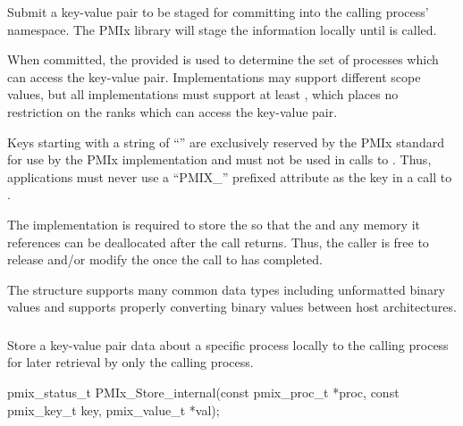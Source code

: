 \descr

Submit a key-value pair to be staged for committing into the calling process' namespace.
The \ac{PMIx} library will stage the information locally until  is called.

When committed, the provided  is used to determine the set of processes which can access
the key-value pair.
Implementations may support different scope values, but all implementations must support at 
least , which places no restriction on the ranks which can access the key-value pair.

Keys starting with a string of ``'' are exclusively reserved by the \ac{PMIx} standard for use by the PMIx implementation and must not be used in calls to .
Thus, applications must never use a ``PMIX_'' prefixed attribute as the key in a call to .

The implementation is required to store the  so that the  and any memory it references can be deallocated after the  call returns.
Thus, the caller is free to release and/or modify the  once the call to  has completed.

The  structure supports many common data types including unformatted binary values and supports properly converting binary values between host architectures.


\subsubsection{}

\summary

Store a key-value pair data about a specific process locally to the calling process for later retrieval by only the calling process.

\format

\cspecificstart
\begin{codepar}
pmix_status_t
PMIx_Store_internal(const pmix_proc_t *proc,
                    const pmix_key_t key,
                    pmix_value_t *val);
\end{codepar}
\cspecificend

\begin{arglist}
\end{arglist}

